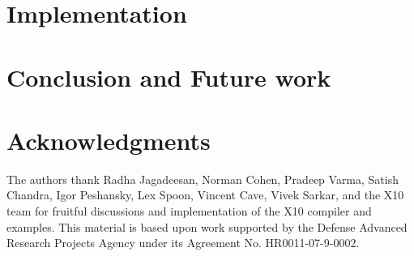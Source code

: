 \documentclass[nocopyrightspace,preprint,9pt]{sigplanconf}
\begin{document}
\section{Implementation}\label{sec:implementation}
\label{sec:impl}


\section{Conclusion and Future work}\label{sec:future}\label{sec:conclusions}
%


\section*{Acknowledgments}

The authors thank Radha Jagadeesan,
Norman Cohen, Pradeep Varma,
Satish Chandra, Igor Peshansky,
Lex Spoon, Vincent Cave, Vivek Sarkar,
and the X10 team for fruitful discussions and implementation of
the X10 compiler and examples.
This material is based upon work supported by the Defense
Advanced Research Projects Agency under its Agreement No.
HR0011-07-9-0002.




\balance


% 
\end{document}
